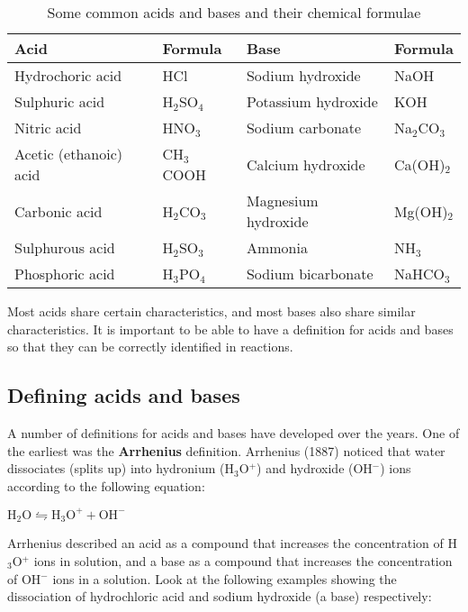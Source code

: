 \begin{table}[h]
\begin{center}
\caption{Some common acids and bases and their chemical formulae}
\label{tab:acids and bases}

\begin{tabular}{|l|l||l|l|}\hline
\textbf{Acid} & \textbf{Formula} & \textbf{Base} & \textbf{Formula}\\\hline
Hydrochoric acid & HCl & Sodium hydroxide & NaOH \\\hline
Sulphuric acid & H$_{2}$SO$_{4}$ & Potassium hydroxide & KOH \\\hline
Nitric acid & HNO$_{3}$ & Sodium carbonate & Na$_{2}$CO$_{3}$\\\hline
Acetic (ethanoic) acid & CH$_{3}$COOH & Calcium hydroxide & Ca(OH)$_{2}$ \\\hline
Carbonic acid & H$_{2}$CO$_{3}$ & Magnesium hydroxide & Mg(OH)$_{2}$ \\\hline
Sulphurous acid & H$_{2}$SO$_{3}$ & Ammonia & NH$_{3}$ \\\hline
Phosphoric acid & H$_{3}$PO$_{4}$ & Sodium bicarbonate & NaHCO$_{3}$ \\\hline
\end{tabular}
\end{center}
\end{table}

Most acids share certain characteristics, and most bases also share similar characteristics. It is important to be able to have a definition for acids and bases so that they can be correctly identified in reactions.

\subsection{Defining acids and bases}

A number of definitions for acids and bases have developed over the years. One of the earliest was the \textbf{Arrhenius} definition. Arrhenius (1887) noticed that water dissociates (splits up) into hydronium (H$_{3}$O$^{+}$) and hydroxide (OH$^{-}$) ions according to the following equation:

\begin{center}
$\text{H}_{2}\text{O} \leftrightharpoons \text{H}_{3}\text{O}^{+} + \text{OH}^{-}$
\end{center}


Arrhenius described an acid as a compound that increases the concentration of H$_{3}$O$^{+}$ ions in solution, and a base as a compound that increases the concentration of OH$^{-}$ ions in a solution. Look at the following examples showing the dissociation of hydrochloric acid and sodium hydroxide (a base) respectively:

